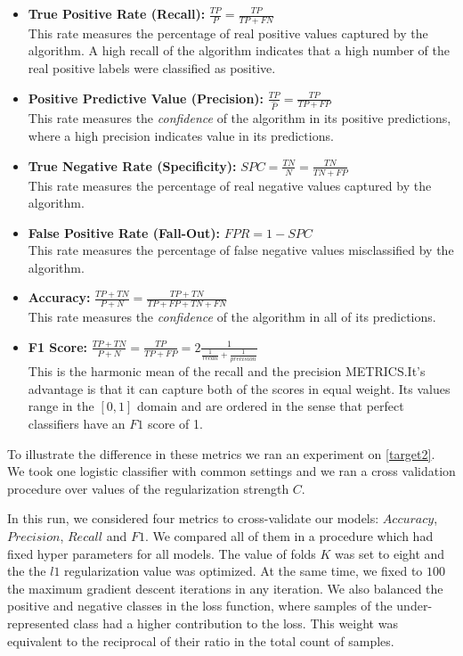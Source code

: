 \begin{itemize}
\item \textbf{True Positive Rate (Recall):} $\frac{TP}{P} = \frac{TP}{TP + FN}$ \\ This rate measures the percentage of real positive values captured by the algorithm.
A high recall of the algorithm indicates that a high number of the real positive labels were classified as positive.


\item \textbf{Positive Predictive Value (Precision):} $\frac{TP}{\hat{P}} = \frac{TP}{TP + FP}$ \\ This rate measures the \textit{confidence} of the algorithm in its positive predictions, where a high precision indicates value in its predictions.

\item \textbf{True Negative Rate (Specificity):} $ SPC = \frac{TN}{N} = \frac{TN}{TN + FP}$ \\ This rate measures the percentage of real negative values captured by the algorithm.


\item \textbf{False Positive Rate (Fall-Out):} $FPR = 1 - SPC$ \\ This rate measures the percentage of false negative values misclassified by the algorithm.

\item \textbf{Accuracy:} $\frac{TP + TN}{P + N} = \frac{TP + TN}{TP + FP + TN + FN}$ \\ This rate measures the \textit{confidence} of the algorithm in all of its predictions.


\item \textbf{F1 Score:} $\frac{TP + TN}{P + N} = \frac{TP}{TP + FP} = 2 \frac{1}{ \frac{1}{recall} + \frac{1}{precision} }$ \\ This is the harmonic mean of the recall and the precision METRICS.\@ It's advantage is that it can capture both of the scores in equal weight.
Its values range in the ${[0,1 ]}$ domain and are ordered in the sense that perfect classifiers have an $F1$ score of 1.

\end{itemize}


To illustrate the difference in these metrics we ran an experiment on \cref{target2}.
We took one logistic classifier with common settings and we ran a cross validation procedure over values of the regularization strength $C$.

In this run, we considered four metrics to cross-validate our models: $Accuracy$, $Precision$, $Recall$ and $F1$.
We compared all of them in a procedure which had fixed hyper parameters for all models.
The value of folds $K$ was set to eight and the the $l1$ regularization value was optimized.
At the same time, we fixed to $100$ the maximum gradient descent iterations in any iteration.
We also balanced the positive and negative classes in the loss function, where samples of the under-represented class had a higher contribution to the loss.
This weight was equivalent to the reciprocal of their ratio in the total count of samples.

